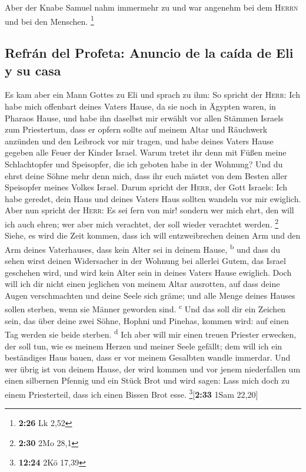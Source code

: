  Aber der Knabe Samuel nahm immermehr zu und war angenehm
bei dem \textsc{Herrn} und bei den Menschen. \footnote{\textbf{2:26} Lk
  2,52}

\hypertarget{refruxe1n-del-profeta-anuncio-de-la-cauxedda-de-eli-y-su-casa}{%
\subsection{Refrán del Profeta: Anuncio de la caída de Eli y su
casa}\label{refruxe1n-del-profeta-anuncio-de-la-cauxedda-de-eli-y-su-casa}}

 Es kam aber ein Mann Gottes zu Eli und sprach zu ihm: So
spricht der \textsc{Herr}: Ich habe mich offenbart deines Vaters Hause,
da sie noch in Ägypten waren, in Pharaos Hause,  und habe
ihn daselbst mir erwählt vor allen Stämmen Israels zum Priestertum, dass
er opfern sollte auf meinem Altar und Räuchwerk anzünden und den
Leibrock vor mir tragen, und habe deines Vaters Hause gegeben alle Feuer
der Kinder Israel.  Warum tretet ihr denn mit Füßen meine
Schlachtopfer und Speisopfer, die ich geboten habe in der Wohnung? Und
du ehrst deine Söhne mehr denn mich, dass ihr euch mästet von dem Besten
aller Speisopfer meines Volkes Israel.  Darum spricht der
\textsc{Herr}, der Gott Israels: Ich habe geredet, dein Haus und deines
Vaters Haus sollten wandeln vor mir ewiglich. Aber nun spricht der
\textsc{Herr}: Es sei fern von mir! sondern wer mich ehrt, den will ich
auch ehren; wer aber mich verachtet, der soll wieder verachtet werden.
\footnote{\textbf{2:30} 2Mo 28,1}  Siehe, es wird die
Zeit kommen, dass ich will entzweibrechen deinen Arm und den Arm deines
Vaterhauses, dass kein Alter sei in deinem Hause, \textsuperscript{b}
 und dass du sehen wirst deinen Widersacher in der
Wohnung bei allerlei Gutem, das Israel geschehen wird, und wird kein
Alter sein in deines Vaters Hause ewiglich.  Doch will
ich dir nicht einen jeglichen von meinem Altar ausrotten, auf dass deine
Augen verschmachten und deine Seele sich gräme; und alle Menge deines
Hauses sollen sterben, wenn sie Männer geworden sind.
\textsuperscript{c}  Und das soll dir ein Zeichen sein,
das über deine zwei Söhne, Hophni und Pinehas, kommen wird: auf einen
Tag werden sie beide sterben. \textsuperscript{d}  Ich
aber will mir einen treuen Priester erwecken, der soll tun, wie es
meinem Herzen und meiner Seele gefällt; dem will ich ein beständiges
Haus bauen, dass er vor meinem Gesalbten wandle immerdar.
 Und wer übrig ist von deinem Hause, der wird kommen und
vor jenem niederfallen um einen silbernen Pfennig und ein Stück Brot und
wird sagen: Lass mich doch zu einem Priesterteil, dass ich einen Bissen
Brot esse. \footnote{\textbf{12:24} 2Kö 17,39}{[}\textbf{2:33} 1Sam
22,20{]}

